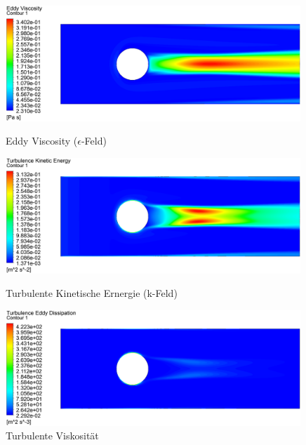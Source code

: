 \begin{figure}
  \centering
  \includegraphics[width=0.99\textwidth]{papers/reynolds/croppedimages/eddy-viscosity.png}
  \caption{Eddy Viscosity ($\epsilon$-Feld)}
  \label{fig:e}
  \centering
  \includegraphics[width=0.99\textwidth]{papers/reynolds/croppedimages/turbulence-kinetic-energy.png}
  \caption{Turbulente Kinetische Ernergie (k-Feld)}
  \label{fig:k}
  \centering
  \includegraphics[width=0.99\textwidth]{papers/reynolds/croppedimages/turbulent-viscosity.png}
  \caption{Turbulente Viskosität}
  \label{fig:mu-t}
\end{figure}
